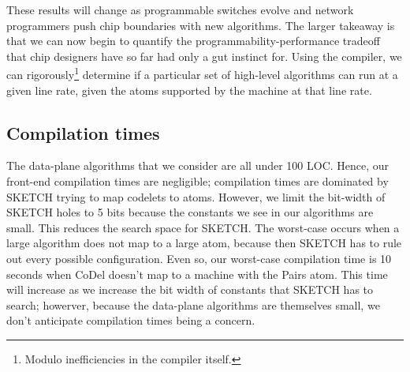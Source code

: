 These results will change as programmable switches evolve and network
programmers push chip boundaries with new algorithms.  The larger takeaway is
that we can now begin to quantify the programmability-performance tradeoff that
chip designers have so far had only a gut instinct for. Using the \pktlanguage
compiler, we can rigorously\footnote{Modulo inefficiencies in the compiler
itself.} determine if a particular set of high-level algorithms can run at a
given line rate, given the atoms supported by the \absmachine machine at that
line rate.

\subsection{Compilation times}
The data-plane algorithms that we consider are all under 100 LOC. Hence, our
front-end compilation times are negligible; compilation times are dominated by
SKETCH trying to map codelets to atoms. However, we limit the bit-width of
SKETCH holes to 5 bits because the constants we see in our algorithms are
small.  This reduces the search space for SKETCH.  The worst-case occurs when a
large algorithm does not map to a large atom, because then SKETCH has to rule
out every possible configuration. Even so, our worst-case compilation time is
10 seconds when CoDel doesn't map to a \absmachine machine with the Pairs atom.
This time will increase as we increase the bit width of constants that SKETCH
has to search; howerver, because the data-plane algorithms are themselves
small, we don't anticipate compilation times being a concern.
